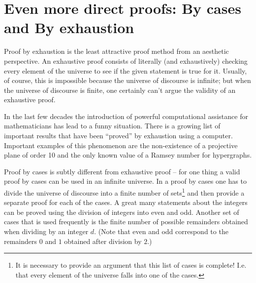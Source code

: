 


\newpage
\section[By cases and By exhaustion]{Even more direct proofs: By cases and By exhaustion}
\label{sec:cases}

Proof by exhaustion is the least attractive proof method from 
an aesthetic perspective.  An exhaustive proof consists of literally
(and exhaustively) checking every element of the universe to see
if the given statement is true for it.  Usually, of course, this is
impossible because the universe of discourse is infinite; but when the
universe of discourse is finite, one certainly can't argue the validity
of an exhaustive proof.  

In the last few decades the introduction of powerful computational
assistance for mathematicians has lead to a funny situation.  There
is a growing list of important results that have been ``proved'' by
exhaustion using a computer.  Important examples of this phenomenon
are the non-existence of a 
projective plane of order 10\cite{lam} and the 
only known value of a 
Ramsey number for hypergraphs\cite{radz}. 

Proof by cases is subtly different from exhaustive proof -- for one 
thing a valid proof by cases can be used in an infinite universe.  
In a proof by cases one has to divide the universe of discourse into
a finite number of sets\footnote{It is necessary to provide an argument that 
this list of cases is complete!  I.e. that every element of the universe
falls into one of the cases.} and then provide a separate proof for each
of the cases.  A great many statements about the integers can be proved
using the division of integers into even and odd.  Another set of 
cases that is used frequently is the finite number of possible remainders
obtained when dividing by an integer $d$.  (Note that even and odd correspond
to the remainders $0$ and $1$ obtained after division by $2$.)    
  
